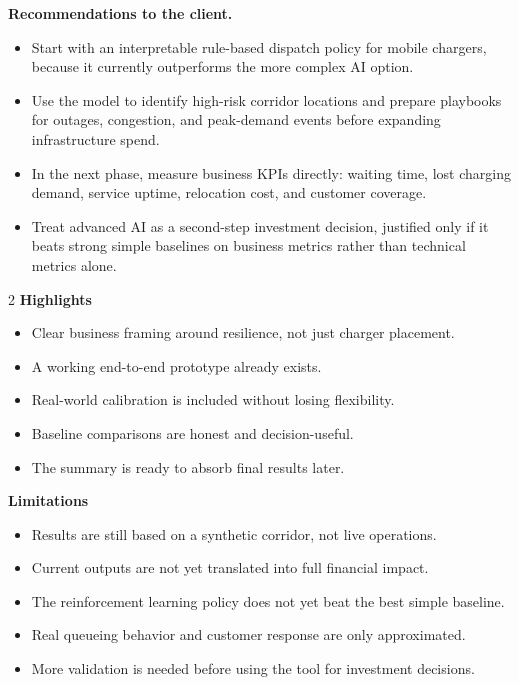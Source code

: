 \documentclass[10pt]{article}
\begin{document}
\textbf{Recommendations to the client.}
\begin{itemize}
\item Start with an interpretable rule-based dispatch policy for mobile chargers, because it currently outperforms the more complex AI option.
\item Use the model to identify high-risk corridor locations and prepare playbooks for outages, congestion, and peak-demand events before expanding infrastructure spend.
\item In the next phase, measure business KPIs directly: waiting time, lost charging demand, service uptime, relocation cost, and customer coverage.
\item Treat advanced AI as a second-step investment decision, justified only if it beats strong simple baselines on business metrics rather than technical metrics alone.
\end{itemize}

\begin{multicols}{2}
\textbf{Highlights}
\begin{itemize}
\item Clear business framing around resilience, not just charger placement.
\item A working end-to-end prototype already exists.
\item Real-world calibration is included without losing flexibility.
\item Baseline comparisons are honest and decision-useful.
\item The summary is ready to absorb final results later.
\end{itemize}

\columnbreak

\textbf{Limitations}
\begin{itemize}
\item Results are still based on a synthetic corridor, not live operations.
\item Current outputs are not yet translated into full financial impact.
\item The reinforcement learning policy does not yet beat the best simple baseline.
\item Real queueing behavior and customer response are only approximated.
\item More validation is needed before using the tool for investment decisions.
\end{itemize}
\end{multicols}
\end{document}
